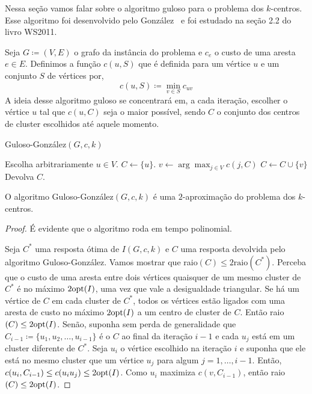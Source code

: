Nessa seção vamos falar sobre o algoritmo guloso para o problema dos $k$-centros. Esse algoritmo foi desenvolvido pelo González~\cite{GONZALEZ1985293} e foi estudado na seção 2.2 do livro WS2011.

Seja $G \coloneqq (V,E)$ o grafo da instância do problema e $c_e$ o custo de uma aresta $e \in E$.
Definimos a função $c(u,S)$ que é definida para um vértice $u$ e um conjunto $S$ de vértices  por,
\[ c(u,S) \coloneqq \min_{v\in S} c_{uv}
    \]
A ideia desse algoritmo guloso se concentrará em, a cada iteração, escolher o vértice $u$ tal que $c(u,C)$ seja o maior possível, sendo $C$ o conjunto dos centros de cluster escolhidos até aquele momento.

\begin{algorithm}
\caption{\sc Guloso-González$(G,c,k)$}
    \label{k-center:guloso}
    \begin{algorithmic}[1]
  \State Escolha arbitrariamente $u \in V$.
        \State $C \gets \{u\}$.
        \State $v \gets \arg\max_{j \in V} c(j,C)$
        \State $C \gets C \cup \{v\}$
        \EndWhile
  \State Devolva $C$.
\end{algorithmic}
\end{algorithm}

\begin{theorem}
    O algoritmo {\sc Guloso-González}$(G,c,k)$ é uma $2$-aproximação do problema dos $k$-centros.
\end{theorem}
\begin{proof}
    É evidente que o algoritmo roda em tempo polinomial. 
  
    Seja $C^*$ uma resposta ótima de $I(G,c,k)$ e $C$ uma resposta devolvida pelo algoritmo {\sc Guloso-González}. Vamos mostrar que raio$(C) \leq 2\text{raio}(C^*) $. Perceba que o custo de uma aresta entre dois vértices quaisquer de um mesmo cluster de $C^*$ é no máximo $2\mathrm{opt}(I)$, uma vez que vale a desigualdade triangular.
    Se há um vértice de $C$ em cada cluster de $C^*$, todos os vértices estão ligados com uma aresta de custo no máximo $2\mathrm{opt}(I)$ a um centro de cluster de $C$. Então raio$(C) \leq 2\mathrm{opt}(I)$. Senão, suponha sem perda de generalidade que $C_{i-1} \coloneqq \{ u_1,u_2,\ldots,u_{i-1}\}$ é o $C$ ao final da iteração $i-1$ e cada $u_j$ está em um cluster diferente de $C^*$. Seja $u_i$ o vértice escolhido na iteração $i$ e suponha que ele está no mesmo cluster que um vértice $u_j$ para algum $j=1,\ldots,i-1$. Então, $c(u_i,C_{i-1}) \leq c(u_iu_j) \leq 2\mathrm{opt}(I)$. Como $u_i$ maximiza $c(v,C_{i-1})$, então raio$(C) \leq 2\mathrm{opt}(I)$.
\end{proof}


